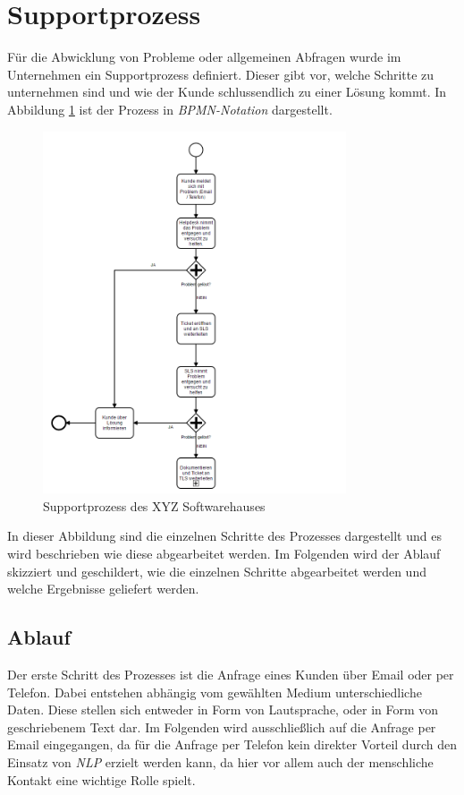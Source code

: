\section{Supportprozess}
Für die Abwicklung von Probleme oder allgemeinen Abfragen wurde im Unternehmen ein Supportprozess definiert. Dieser gibt vor, welche Schritte zu unternehmen sind und wie der Kunde schlussendlich zu einer Lösung kommt. In Abbildung \ref{fig:support-process} ist der Prozess in \textit{BPMN-Notation} dargestellt. 

\begin{figure}[ht]
	\centering
		\includegraphics[width=0.80\textwidth]{images/support_process.PNG}
	\caption{Supportprozess des XYZ Softwarehauses}
	\label{fig:support-process}
\end{figure}

In dieser Abbildung sind die einzelnen Schritte des Prozesses dargestellt und es wird beschrieben wie diese abgearbeitet werden. Im Folgenden wird der Ablauf skizziert und geschildert, wie die einzelnen Schritte abgearbeitet werden und welche Ergebnisse geliefert werden.

\subsection{Ablauf}
Der erste Schritt des Prozesses ist die Anfrage eines Kunden über Email oder per Telefon. Dabei entstehen abhängig vom gewählten Medium unterschiedliche Daten. Diese stellen sich entweder in Form von Lautsprache, oder in Form von geschriebenem Text dar. Im Folgenden wird ausschließlich auf die Anfrage per Email eingegangen, da für die Anfrage per Telefon kein direkter Vorteil durch den Einsatz von \textit{NLP} erzielt werden kann, da hier vor allem auch der menschliche Kontakt eine wichtige Rolle spielt. %

